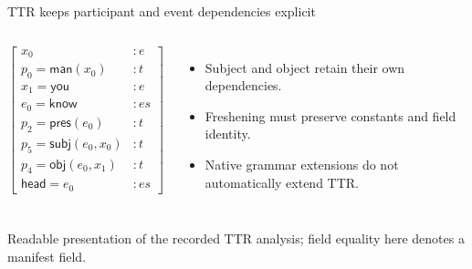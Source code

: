 \documentclass[aspectratio=169,11pt]{beamer}
\newcommand{\aside}[1]{\par{\small\color{Muted}#1}\par}
\newcommand{\pred}[1]{\mathsf{#1}}
\begin{document}
\begin{frame}{TTR keeps participant and event dependencies explicit}
  \color{Ink}
  \begin{columns}[T,onlytextwidth]
    \[\left[\begin{array}{ll}
      x_0 &: e\\
      p_0=\pred{man}(x_0) &: t\\
      x_1=\pred{you} &: e\\
      e_0=\pred{know} &: es\\
      p_2=\pred{pres}(e_0) &: t\\
      p_5=\pred{subj}(e_0,x_0) &: t\\
      p_4=\pred{obj}(e_0,x_1) &: t\\
      \pred{head}=e_0 &: es
    \end{array}\right]\]
    \vspace{3mm}
    \begin{itemize}\setlength\itemsep{9pt}
      \item Subject and object retain their own dependencies.
      \item Freshening must preserve constants and field identity.
      \item Native grammar extensions do not automatically extend TTR.
    \end{itemize}
  \end{columns}
  \aside{Readable presentation of the recorded TTR analysis; field equality here denotes a manifest field.}
\end{frame}
\end{document}
